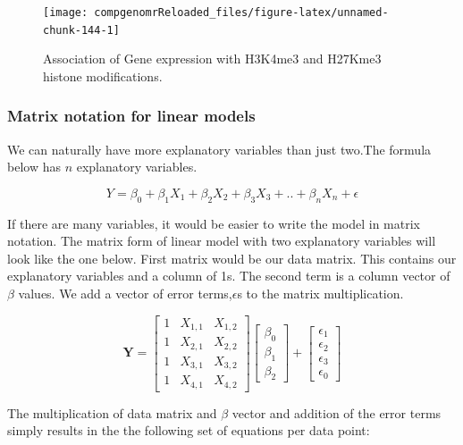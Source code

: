 \documentclass[12pt,]{krantz}
\begin{document}
\begin{figure}

{\centering \texttt{[image: compgenomrReloaded\_files/figure-latex/unnamed-chunk-144-1]} 

}

\caption{Association of Gene expression with H3K4me3 and H27Kme3 histone modifications.}\label{fig:unnamed-chunk-144}
\end{figure}

\hypertarget{matrix-notation-for-linear-models}{%
\subsubsection{Matrix notation for linear models}\label{matrix-notation-for-linear-models}}

We can naturally have more explanatory variables than just two.The formula
below has \(n\) explanatory variables.

\[Y= \beta_0+\beta_1X_1+\beta_2X_2 +  \beta_3X_3 + .. + \beta_nX_n +\epsilon\]

If there are many variables, it would be easier
to write the model in matrix notation. The matrix form of linear model with
two explanatory variables will look like the one
below. First matrix would be our data matrix. This contains our explanatory
variables and a column of 1s. The second term is a column vector of \(\beta\)
values. We add a vector of error terms,\(\epsilon\)s to the matrix multiplication.

\[
 \mathbf{Y} = \left[\begin{array}{rrr}
1 & X_{1,1} & X_{1,2} \\
1 & X_{2,1} & X_{2,2} \\
1 & X_{3,1} & X_{3,2} \\
1 & X_{4,1} & X_{4,2}
\end{array}\right]
%
\left[\begin{array}{rrr}
\beta_0 \\
\beta_1 \\
\beta_2 
\end{array}\right]
% 
+
\left[\begin{array}{rrr}
\epsilon_1 \\
\epsilon_2 \\ 
\epsilon_3 \\ 
\epsilon_0
\end{array}\right]
\]

The multiplication of data matrix and \(\beta\) vector and addition of the
error terms simply results in the the following set of equations per data point:
\end{document}
